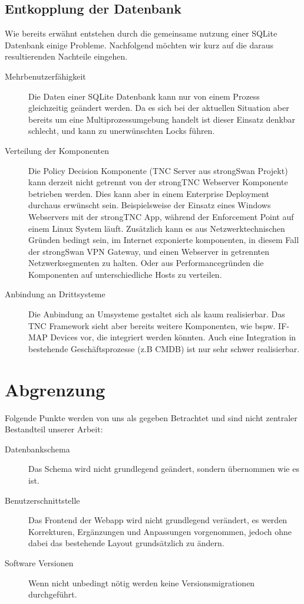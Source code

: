 \subsection{Entkopplung der Datenbank} Wie bereits erwähnt entstehen durch die
gemeinsame nutzung einer SQLite Datenbank einige Probleme. Nachfolgend möchten wir kurz auf die daraus resultierenden Nachteile eingehen.
\begin{description}
\item[Mehrbenutzerfähigkeit]
Die Daten einer SQLite Datenbank kann nur von einem Prozess gleichzeitig geändert werden.
Da es sich bei der aktuellen Situation aber bereits um eine Multiprozessumgebung handelt ist dieser Einsatz denkbar schlecht, und kann zu unerwünschten Locks führen.

\item[Verteilung der Komponenten] Die Policy Decision Komponente (TNC Server aus
strongSwan Projekt) kann derzeit nicht getrennt von der strongTNC Webserver
Komponente betrieben werden. Dies kann aber in einem Enterprise Deployment
durchaus erwünscht sein. Beispielsweise der Einsatz eines Windows Webservers mit der strongTNC App, während der Enforcement Point auf einem Linux System läuft. Zusätzlich kann es aus Netzwerktechnischen Gründen bedingt sein, im Internet exponierte komponenten, in diesem Fall der strongSwan VPN Gateway, und einen Webserver in getrennten Netzwerksegmenten zu halten. Oder aus Performancegründen die Komponenten auf unterschiedliche Hosts zu verteilen.

\item[Anbindung an Drittsysteme]
Die Anbindung an Umsysteme gestaltet sich als kaum realisierbar. Das TNC Framework sieht aber bereits weitere Komponenten, wie bspw. IF-MAP Devices vor, die integriert werden könnten. Auch eine Integration in bestehende Geschäftsprozesse (z.B CMDB) ist nur sehr schwer realisierbar.
\end{description}

\section{Abgrenzung}
Folgende Punkte werden von uns als gegeben Betrachtet und sind nicht zentraler
Bestandteil unserer Arbeit:
\begin{description}
	\item[Datenbankschema] Das Schema wird nicht grundlegend geändert, sondern
	übernommen wie es ist.
	
	\item[Benutzerschnittstelle] Das Frontend der Webapp wird nicht grundlegend
	verändert, es werden Korrekturen, Ergänzungen und Anpassungen vorgenommen,
	jedoch ohne dabei das bestehende Layout grundsätzlich zu ändern.
	
	\item[Software Versionen] Wenn nicht unbedingt nötig werden keine
	Versionsmigrationen durchgeführt.
\end{description}


